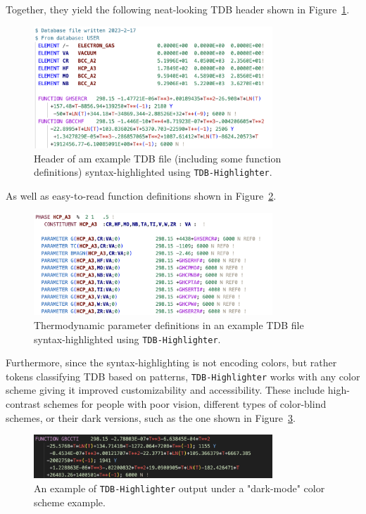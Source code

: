 Together, they yield the following neat-looking TDB header shown in Figure~\ref{osoft:fig:tdbheader}.

\begin{figure}[H]
    \centering
    \includegraphics[width=0.8\textwidth]{tangentialsoft/Fig1.png}
    \caption{Header of am example TDB file (including some function definitions) syntax-highlighted using \texttt{TDB-Highlighter}.}
    \label{osoft:fig:tdbheader}
\end{figure}

As well as easy-to-read function definitions shown in Figure~\ref{osoft:fig:tdbfunctions}.

\begin{figure}[H]
    \centering
    \includegraphics[width=0.8\textwidth]{tangentialsoft/Fig2-2.png}
    \caption{Thermodynamic parameter definitions in an example TDB file syntax-highlighted using \texttt{TDB-Highlighter}.}
    \label{osoft:fig:tdbfunctions}
\end{figure}

Furthermore, since the syntax-highlighting is not encoding colors, but rather tokens classifying TDB based on patterns, \texttt{TDB-Highlighter} works with any color scheme giving it improved customizability and accessibility. These include high-contrast schemes for people with poor vision, different types of color-blind schemes, or their dark versions, such as the one shown in Figure~\ref{osoft:fig:tdbdarkmode}.

\begin{figure}[H]
    \centering
    \includegraphics[width=0.8\textwidth]{tangentialsoft/Fig3.png}
    \caption{An example of \texttt{TDB-Highlighter} output under a "dark-mode" color scheme example.}
    \label{osoft:fig:tdbdarkmode}
\end{figure}

